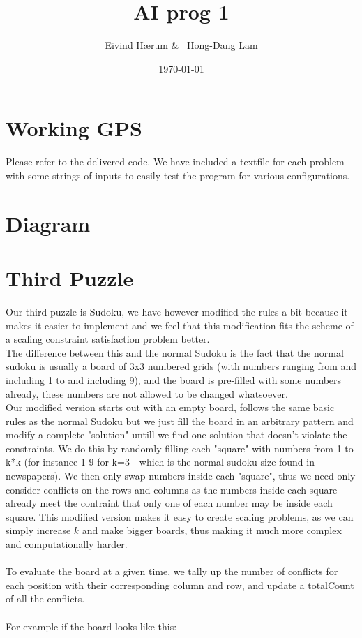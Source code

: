 \documentclass[12pt, a4paper]{article}
\title{AI prog 1}
\author{Eivind Hærum \& \ Hong-Dang Lam}
\date{\today} %
\begin{document}
\maketitle
% 
% 
 
\newpage
\tableofcontents
\newpage
 
\section{Working GPS}
Please refer to the delivered code.
We have included a textfile for each problem with some strings of inputs to easily test the program for various configurations.

\section{Diagram}

\section{Third Puzzle}
Our third puzzle is Sudoku, we have however modified the rules a bit because it makes it easier to implement and we feel that this modification fits the scheme of a scaling constraint satisfaction problem better.\\
The difference between this and the normal Sudoku is the fact that the normal sudoku is usually a board of 3x3 numbered grids (with numbers ranging from and including 1 to and including 9), and the board is pre-filled with some numbers already, these numbers are not allowed to be changed whatsoever.\\
Our modified version starts out with an empty board, follows the same basic rules as the normal Sudoku but we just fill the board in an arbitrary pattern and modify a complete "solution" untill we find one solution that doesn't violate the constraints. We do this by randomly filling each "square" with numbers from 1 to k*k (for instance 1-9 for k=3 - which is the normal sudoku size found in newspapers). We then only swap numbers inside each "square", thus we need only consider conflicts on the rows and columns as the numbers inside each square already meet the contraint that only one of each number may be inside each square. This modified version makes it easy to create scaling problems, as we can simply increase $k$ and make bigger boards, thus making it much more complex and  computationally harder.
\\\\
To evaluate the board at a given time, we tally up the number of conflicts for each position with their corresponding column and row, and update a totalCount of all the conflicts.
\\\\
For example if the board looks like this:
\end{document}
